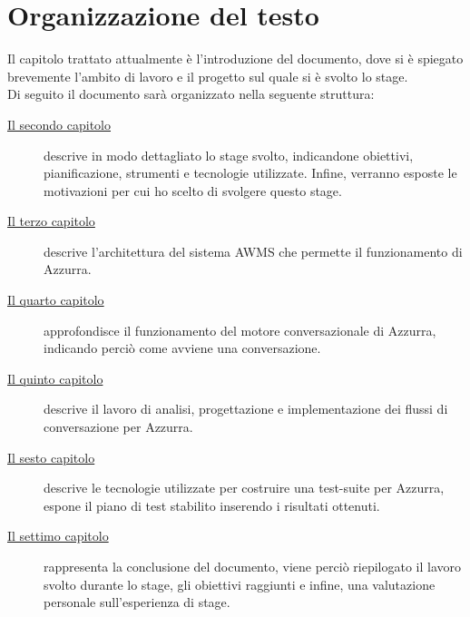 \section{Organizzazione del testo}
Il capitolo trattato attualmente è l'introduzione del documento, dove si è spiegato brevemente l'ambito di lavoro e il progetto sul quale si è svolto lo stage.\\
Di seguito il documento sarà organizzato nella seguente struttura:
\begin{description}
    
    \item[{\hyperref[cap:descrizione-stage]{Il secondo capitolo}}] descrive in modo dettagliato lo stage svolto, indicandone obiettivi, pianificazione, strumenti e tecnologie utilizzate. Infine, verranno esposte le motivazioni per cui ho scelto di svolgere questo stage.
    
    \item[{\hyperref[cap:archittettura del sistema AWMS]{Il terzo capitolo}}] descrive l'architettura del sistema \gls{AWMS} che permette il funzionamento di Azzurra.
    
    \item[{\hyperref[cap:flow engine]{Il quarto capitolo}}] approfondisce il funzionamento del motore conversazionale di Azzurra, indicando perciò come avviene una conversazione.
    
    \item[{\hyperref[cap:flussi di conversazione]{Il quinto capitolo}}] descrive il lavoro di analisi, progettazione e implementazione dei flussi di conversazione per Azzurra.
    
    \item[{\hyperref[cap:test]{Il sesto capitolo}}] descrive le tecnologie utilizzate per costruire una test-suite per Azzurra, espone il piano di test stabilito inserendo i risultati ottenuti.
    
    \item[{\hyperref[cap:conclusioni]{Il settimo capitolo}}] rappresenta la conclusione del documento, viene perciò riepilogato il lavoro svolto durante lo stage, gli obiettivi raggiunti e infine, una valutazione personale sull'esperienza di stage.
\end{description}
